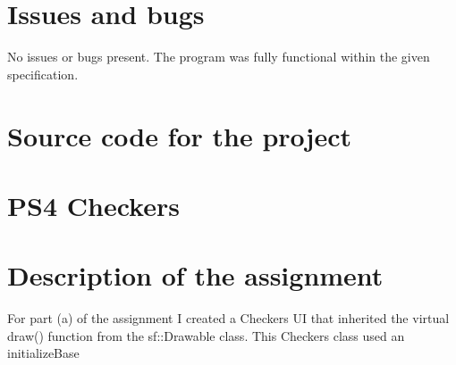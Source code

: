 \documentclass[12pt]{article}
\begin{document}
\section[5]{Issues and bugs}
\hfill\begin{minipage}{\dimexpr\textwidth-1cm}
No issues or bugs present. \newline
The program was fully functional within the given specification.
\end{minipage}

\section[6]{Source code for the project}


\setcounter{section}{0}
\newpage
\section*{PS4 Checkers}
\section[1]{Description of the assignment}
\hfill\begin{minipage}{\dimexpr\textwidth-1cm}
For part (a) of the assignment I created a Checkers UI that inherited the virtual draw() function from the sf::Drawable class. This Checkers class used an initializeBase
\end{minipage}
\end{document}
